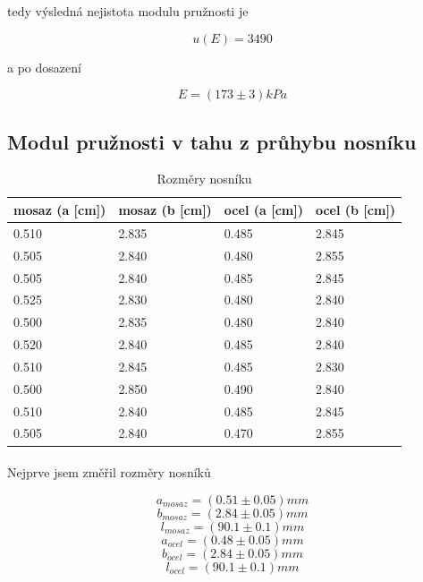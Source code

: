 \documentclass[a4paper,11pt]{article}
\begin{document}
        tedy výsledná nejistota modulu pružnosti je
        
        $$u(E) = 3490$$

        a po dosazení

        $$E = (173 \pm 3) kPa$$

    \subsection{Modul pružnosti v tahu z průhybu nosníku}

        \begin{table}[h]
            \centering
            \begin{tabular}{ | l | l || l | l | }
                \hline
                    mosaz (a [cm]) & mosaz (b [cm]) & ocel (a [cm]) & ocel (b [cm]) \\ \hline
                    0.510 & 2.835 & 0.485 & 2.845 \\ \hline
                    0.505 & 2.840 & 0.480 & 2.855 \\ \hline
                    0.505 & 2.840 & 0.485 & 2.845 \\ \hline
                    0.525 & 2.830 & 0.480 & 2.840 \\ \hline
                    0.500 & 2.835 & 0.480 & 2.840 \\ \hline
                    0.520 & 2.840 & 0.485 & 2.840 \\ \hline
                    0.510 & 2.845 & 0.485 & 2.830 \\ \hline
                    0.500 & 2.850 & 0.490 & 2.840 \\ \hline
                    0.510 & 2.840 & 0.485 & 2.845 \\ \hline
                    0.505 & 2.840 & 0.470 & 2.855 \\
                \hline
            \end{tabular}
            \caption{Rozměry nosníku}
            \label{fig:rozmery}
        \end{table}

        \paragraph{} Nejprve jsem změřil rozměry nosníků 

        $$a_{mosaz} = (0.51 \pm 0.05) mm$$
        $$b_{mosaz} = (2.84 \pm 0.05) mm$$
        $$l_{mosaz} = (90.1 \pm 0.1) mm$$
        $$a_{ocel} = (0.48 \pm 0.05) mm$$
        $$b_{ocel} = (2.84 \pm 0.05) mm$$
        $$l_{ocel} = (90.1 \pm 0.1) mm$$
        
\end{document}
